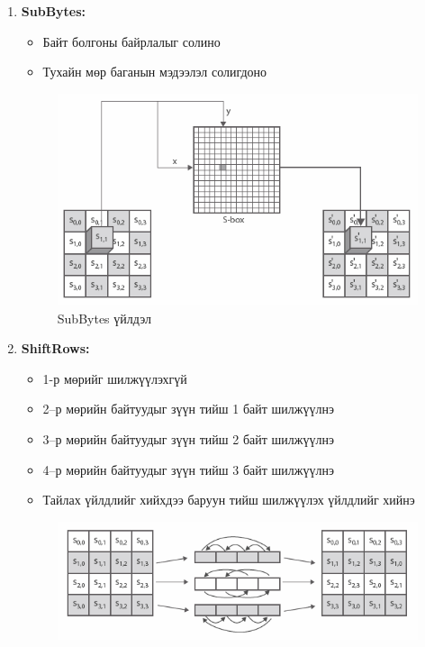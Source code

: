 	\begin{enumerate}
		\item \textbf{SubBytes:}
		      \begin{itemize}
			      \item Байт болгоны байрлалыг солино
			      \item Тухайн мөр баганын мэдээлэл солигдоно
		      \end{itemize}
		      \begin{figure}[h]
			      \centering
			      \includegraphics[scale=0.65]{assets/subbytes.png}
			      \caption{SubBytes үйлдэл}
			      \label{fig:subbytes}
		      \end{figure}
		\item \textbf{ShiftRows:}
		      \begin{itemize}
			      \item 1-р мөрийг шилжүүлэхгүй
			      \item 2–р мөрийн байтуудыг зүүн тийш 1 байт шилжүүлнэ
			      \item 3–р мөрийн байтуудыг зүүн тийш 2 байт шилжүүлнэ
			      \item 4–р мөрийн байтуудыг зүүн тийш 3 байт шилжүүлнэ
			      \item Тайлах үйлдлийг хийхдээ баруун тийш шилжүүлэх үйлдлийг хийнэ
		      \end{itemize}
		      \begin{figure}[h]
			      \centering
			      \includegraphics[scale=0.6]{assets/shiftrows.png}

\end{figure}
\end{enumerate}
